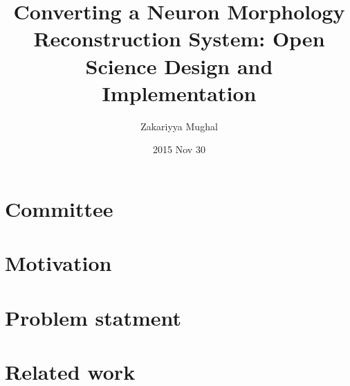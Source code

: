 \documentclass[%
        hyperref={%
                pdfauthor={Zakariyya Mughal},%
                pdfpagemode={None},pdfpagelayout={SinglePage}}%
        xcolor={x11names},%
]{beamer}
\title[\ensuremath{\mathrm{ORION}^c}]{Converting a Neuron Morphology Reconstruction System: Open Science Design and Implementation}
\author{Zakariyya Mughal}
\institute{Computational Biomedicine Lab\\University of Houston}
\date{2015 Nov 30}
\begin{document}
\frame{\titlepage}

\section{Committee}
\begin{frame}
\end{frame}

\section{Motivation}
\begin{frame}
\end{frame}

\section{Problem statment}
\begin{frame}
\end{frame}

\section{Related work}
\begin{frame}
\end{frame}
\end{document}

